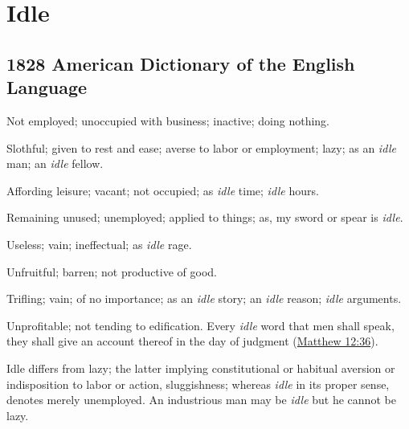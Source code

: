 \section{Idle}
	\label{IDLENESS}
	

\subsection{1828 American Dictionary of the English Language} %
	\label{IDLENESS-1828}

	\begin{compactitem}
		\item[1] Not employed; unoccupied with business; inactive; doing nothing.
		\item[2] Slothful; given to rest and ease; averse to labor or employment; lazy; as an \textit{idle} man; an \textit{idle} fellow.
		\item[3] Affording leisure; vacant; not occupied; as \textit{idle} time; \textit{idle} hours.
		\item[4] Remaining unused; unemployed; applied to things; as, my sword or spear is \textit{idle}.
		\item[5] Useless; vain; ineffectual; as \textit{idle} rage.
		\item[6] Unfruitful; barren; not productive of good.
		\item[7] Trifling; vain; of no importance; as an \textit{idle} story; an \textit{idle} reason; \textit{idle} arguments.
		\item[8] Unprofitable; not tending to edification. Every \textit{idle} word that men shall speak, they shall give an account thereof in the day of judgment (\hyperref[MATTHEW-12-36]{Matthew 12:36}).
		\item Idle differs from lazy; the latter implying constitutional or habitual aversion or indisposition to labor or action, sluggishness; whereas \textit{idle} in its proper sense, denotes merely unemployed. An industrious man may be \textit{idle} but he cannot be lazy.
	\end{compactitem}

